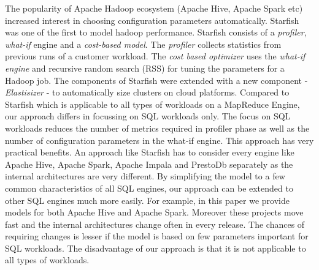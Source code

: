 The popularity of Apache Hadoop ecosystem (Apache Hive, Apache Spark etc) increased interest
in choosing configuration parameters automatically. 
Starfish \cite{herodotou2011starfish} was one of the first to model hadoop performance. Starfish 
consists of a \textit{profiler}, \textit{what-if} engine and a \textit{cost-based model}\cite{herodotou2011profiling}. 
The \textit{profiler} collects statistics from previous runs of a customer workload.
 The \textit{cost based optimizer} uses the \textit{what-if engine}
and recursive random search (RSS) for tuning the parameters for a Hadoop job. The components of
Starfish were extended with a new component - \textit{Elastisizer}\cite{HerodotouNoOne}
- to automatically size clusters on cloud platforms. 
Compared to Starfish which is applicable to all types of workloads on a MapReduce Engine, our approach differs in focussing on SQL workloads only. The focus on 
SQL workloads reduces the number of metrics required in profiler phase as well as the number of configuration parameters in the what-if engine.
This approach has very practical benefits. An approach like Starfish has to consider every engine like Apache Hive, Apache Spark, Apache Impala and PrestoDb separately
as the internal architectures are very different. By simplifying the model to a few common characteristics of all SQL engines, our approach can be extended
to other SQL engines much more easily. For example, in this paper we provide models for both Apache Hive and Apache Spark. Moreover these projects move 
fast and the internal architectures change often in every release. The chances of requiring changes is lesser if the model is based on few parameters important for SQL workloads.
The disadvantage of our approach is that it is not applicable to all types of workloads. 

